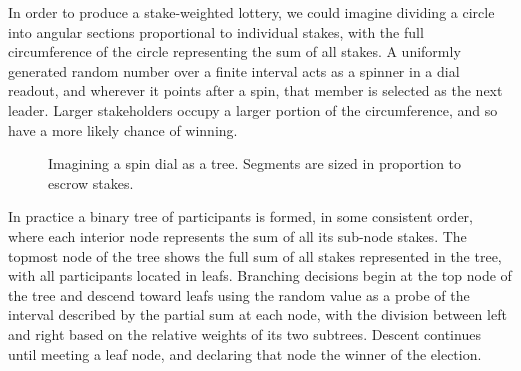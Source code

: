 \documentclass{yellowpaper}
\begin{document}
In order to produce a stake-weighted lottery, we could imagine dividing a circle into angular sections proportional to individual stakes, with the full circumference of the circle representing the sum of all stakes. A uniformly generated random number over a finite interval acts as a spinner in a dial readout, and wherever it points after a spin, that member is selected as the next leader. Larger stakeholders occupy a larger portion of the circumference, and so have a more likely chance of winning.

\begin{figure}[h!]
\centering


\bigskip


\caption{Imagining a spin dial as a tree. Segments
are sized in proportion to escrow stakes.}
  \label{fig:spinner}
\end{figure}


In practice a binary tree of participants is formed, in some consistent order, where each interior node represents the sum of all its sub-node stakes. The topmost node of the tree shows the full sum of all stakes represented in the tree, with all participants located in leafs. Branching decisions begin at the top node of the tree and descend toward leafs using the random value as a probe of the interval described by the partial sum at each node, with the division between left and right based on the relative weights of its two subtrees. Descent continues until meeting a leaf node, and declaring that node the winner of the election. 
\end{document}
